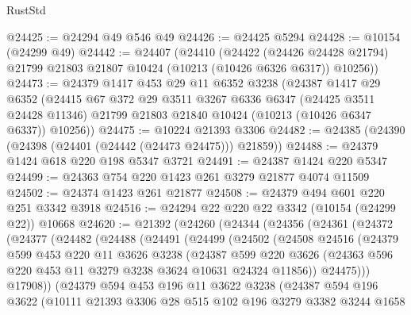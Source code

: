 \begin{lexlean}{RustStd}
\begin{coremodule}
{\begin{coremodule}
{{{{{{{{{{{{{{{{{{{{{{{{{{@24425 := @24294 @49 @546 @49
@24426 := @24425 @5294
@24428 := @10154 (@24299 @49)
@24442 := @24407
    (@24410
      (@24422
        (@24426 @24428 @21794)
        @21799
        @21803
        @21807
        @10424
        (@10213 (@10426 @6326 @6317))
        @10256))
@24473 := @24379
    @1417
    @453
    @29
    @11
    @6352
    @3238
    (@24387
      @1417
      @29
      @6352
      (@24415
        @67
        @372
        @29
        @3511
        @3267
        @6336
        @6347
        (@24425 @3511 @24428 @11346)
        @21799
        @21803
        @21840
        @10424
        (@10213 (@10426 @6347 @6337))
        @10256))
@24475 := @10224 @21393 @3306
@24482 := @24385 (@24390 (@24398 (@24401 (@24442 (@24473 @24475))) @21859))
@24488 := @24379 @1424 @618 @220 @198 @5347 @3721
@24491 := @24387 @1424 @220 @5347
@24499 := @24363 @754 @220 @1423 @261 @3279 @21877 @4074 @11509
@24502 := @24374 @1423 @261 @21877
@24508 := @24379 @494 @601 @220 @251 @3342 @3918
@24516 := @24294 @22 @220 @22 @3342 (@10154 (@24299 @22)) @10668
@24620 := @21392
    (@24260
      (@24344
        (@24356
          (@24361
            (@24372
              (@24377
                (@24482
                  (@24488
                    (@24491
                      (@24499
                        (@24502
                          (@24508
                            @24516
                            (@24379
                              @599
                              @453
                              @220
                              @11
                              @3626
                              @3238
                              (@24387
                                @599
                                @220
                                @3626
                                (@24363 @596 @220 @453 @11 @3279 @3238 @3624 @10631 @24324 @11856))
                              @24475)))
                        @17908))
                    (@24379
                      @594
                      @453
                      @196
                      @11
                      @3622
                      @3238
                      (@24387
                        @594
                        @196
                        @3622
                        (@10111
                          @21393
                          @3306
                          @28
                          @515
                          @102
                          @196
                          @3279
                          @3382
                          @3244
                          @1658
}}}}}}}}}}}}}}}}}}}}}}}}}}
\end{coremodule}}
\end{coremodule}
\end{lexlean}

